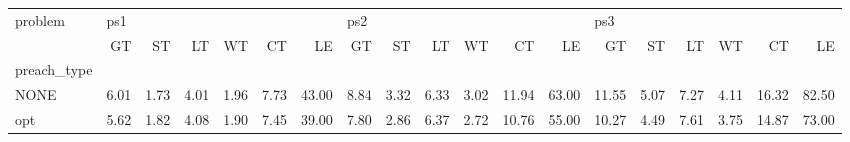 \begin{tabular}{lrrrrrrrrrrrrrrrrrr}
\toprule
problem & \multicolumn{6}{l}{ps1} & \multicolumn{6}{l}{ps2} & \multicolumn{6}{l}{ps3} \\
{} &   GT &   ST &   LT &   WT &   CT &    LE &   GT &   ST &   LT &   WT &    CT &    LE &    GT &   ST &   LT &   WT &    CT &    LE \\
preach\_type &      &      &      &      &      &       &      &      &      &      &       &       &       &      &      &      &       &       \\
\midrule
NONE        & 6.01 & 1.73 & 4.01 & 1.96 & 7.73 & 43.00 & 8.84 & 3.32 & 6.33 & 3.02 & 11.94 & 63.00 & 11.55 & 5.07 & 7.27 & 4.11 & 16.32 & 82.50 \\
opt         & 5.62 & 1.82 & 4.08 & 1.90 & 7.45 & 39.00 & 7.80 & 2.86 & 6.37 & 2.72 & 10.76 & 55.00 & 10.27 & 4.49 & 7.61 & 3.75 & 14.87 & 73.00 \\
\bottomrule
\end{tabular}
